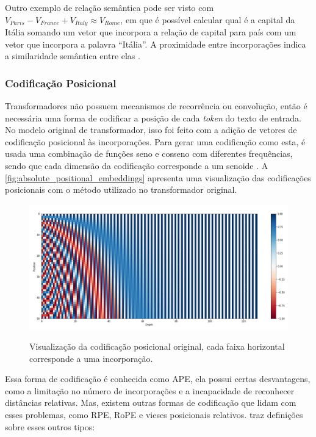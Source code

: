 Outro exemplo de relação semântica pode ser visto com \begin{math}V_{Paris} - V_{France} + V_{Italy} \approx V_{Rome}\end{math}, em que é possível calcular qual é a
capital da Itália somando um vetor que incorpora a relação de capital para país com um vetor que incorpora a palavra ``Itália''. A proximidade entre incorporações indica
a similaridade semântica entre elas \cite{word2vec_estimation}.

\subsubsection{Codificação Posicional}

Transformadores não possuem mecanismos de recorrência ou convolução, então é necessária uma forma de codificar a posição de cada \textit{token} do texto de entrada. No
modelo original de transformador, isso foi feito com a adição de vetores de codificação posicional às incorporações. Para gerar uma codificação como esta, é usada uma
combinação de funções seno e cosseno com diferentes frequências, sendo que cada dimensão da codificação corresponde a um senoide \cite{transformer}. A
\autoref{fig:absolute_positional_embeddings} apresenta uma visualização das codificações posicionais com o método utilizado no transformador original.

\begin{figure}[ht]
      \centering
      \caption{\small Visualização da codificação posicional original, cada faixa horizontal corresponde a uma incorporação.}
      \includegraphics[width=1.0\columnwidth,keepaspectratio]{images/absolute_positional_embeddings.png}
      \label{fig:absolute_positional_embeddings}
\end{figure}

Essa forma de codificação é conhecida como \ac{APE}, ela possui certas desvantagens, como a limitação no número de incorporações e a incapacidade de reconhecer
distâncias relativas. Mas, existem outras formas de codificação que lidam com esses problemas, como \ac{RPE}, \acl{RoPE} e vieses posicionais relativos.
\textcite{llm_survey_2024} traz definições sobre esses outros tipos:

